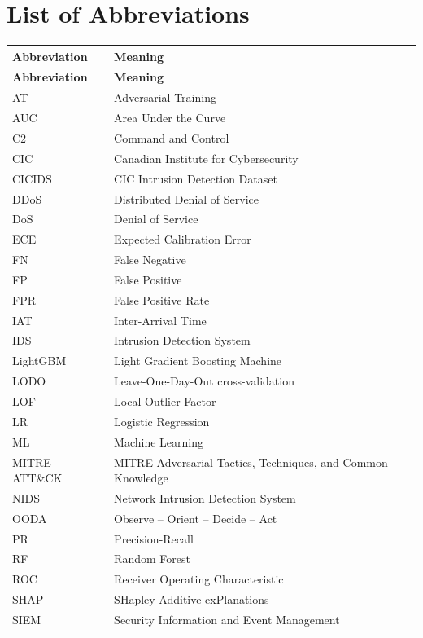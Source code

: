 \chapter*{List of Abbreviations}

\begin{longtable}{ll}
    \toprule
    \textbf{Abbreviation} & \textbf{Meaning} \\
    \midrule \endfirsthead
    \toprule
    \textbf{Abbreviation} & \textbf{Meaning} \\
    \midrule \endhead
    AT & Adversarial Training \\
    AUC & Area Under the Curve \\
    C2 & Command and Control \\
    CIC & Canadian Institute for Cybersecurity \\
    CICIDS & CIC Intrusion Detection Dataset \\
    DDoS & Distributed Denial of Service \\
    DoS & Denial of Service \\
    ECE & Expected Calibration Error \\
    FN & False Negative \\
    FP & False Positive \\
    FPR & False Positive Rate \\
    IAT & Inter-Arrival Time \\
    IDS & Intrusion Detection System \\
    LightGBM & Light Gradient Boosting Machine \\
    LODO & Leave-One-Day-Out cross-validation \\
    LOF & Local Outlier Factor \\
    LR & Logistic Regression \\
    ML & Machine Learning \\
    MITRE ATT\&CK & MITRE Adversarial Tactics, Techniques, and Common Knowledge \\
    NIDS & Network Intrusion Detection System \\
    OODA & Observe -- Orient -- Decide -- Act \\
    PR & Precision-Recall \\
    RF & Random Forest \\
    ROC & Receiver Operating Characteristic \\
    SHAP & SHapley Additive exPlanations \\
    SIEM & Security Information and Event Management \\

\end{longtable}
